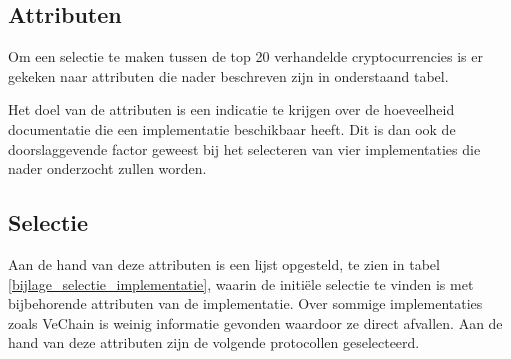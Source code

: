 \subsection{Attributen}
Om een selectie te maken tussen de top 20 verhandelde cryptocurrencies is er gekeken naar attributen die nader beschreven zijn in onderstaand tabel.

\begin{centering}
  \begin{table}[ht]
    \label{selectie-attributen}
    \caption{Attributen opgesteld voor initiële selectie implementaties.}
  \end{table}
\end{centering}

Het doel van de attributen is een indicatie te krijgen over de hoeveelheid documentatie die een implementatie beschikbaar heeft. Dit is dan ook de doorslaggevende factor geweest bij het selecteren van vier implementaties die nader onderzocht zullen worden.

\subsection{Selectie}

Aan de hand van deze attributen is een lijst opgesteld, te zien in tabel \ref{bijlage_selectie_implementatie}, waarin de initiële selectie te vinden is met bijbehorende attributen van de implementatie. Over sommige implementaties zoals VeChain is weinig informatie gevonden waardoor ze direct afvallen. Aan de hand van deze attributen zijn de volgende protocollen geselecteerd.

